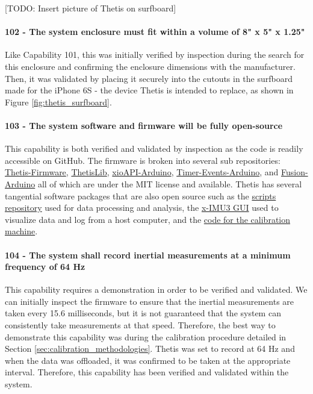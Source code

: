 [TODO: Insert picture of Thetis on surfboard]

\paragraph*{102 - The system enclosure must fit within a volume of 8" x 5" x 1.25"} Like Capability 101, this was initially verified by inspection during the search for this enclosure and confirming the enclosure dimensions with the manufacturer.
Then, it was validated by placing it securely into the cutouts in the surfboard made for the iPhone 6S - the device Thetis is intended to replace, as shown in Figure \ref{fig:thetis_surfboard}.

\paragraph*{103 - The system software and firmware will be fully open-source} This capability is both verified and validated by inspection as the code is readily accessible on GitHub.
The firmware is broken into several sub repositories: \href{https://github.com/Legohead259/Thetis-Firmware}{Thetis-Firmware}, \href{https://github.com/Legohead259/ThetisLib}{ThetisLib}, \href{https://github.com/Legohead259/xioAPI-Arduino}{xioAPI-Arduino}, \href{https://github.com/Legohead259/Timer-Events-Arduino}{Timer-Events-Arduino}, and \href{https://github.com/Legohead259/Fusion-Arduino}{Fusion-Arduino} all of which are under the MIT license and available.
Thetis has several tangential software packages that are also open source such as the \href{https://github.com/Legohead259/Thetis-Scripts}{scripts repository} used for data processing and analysis, the \href{https://github.com/xioTechnologies/x-IMU3-Software}{x-IMU3 GUI} used to visualize data and log from a host computer, and the \href{https://github.com/Legohead259/Thetis-Calibration}{code for the calibration machine}.

\paragraph*{104 - The system shall record inertial measurements at a minimum frequency of 64 Hz} This capability requires a demonstration in order to be verified and validated.
We can initially inspect the firmware to ensure that the inertial measurements are taken every 15.6 milliseconds, but it is not guaranteed that the system can consistently take measurements at that speed.
Therefore, the best way to demonstrate this capability was during the calibration procedure detailed in Section \ref{sec:calibration_methodologies}.
Thetis was set to record at 64 Hz and when the data was offloaded, it was confirmed to be taken at the appropriate interval.
Therefore, this capability has been verified and validated within the system.

